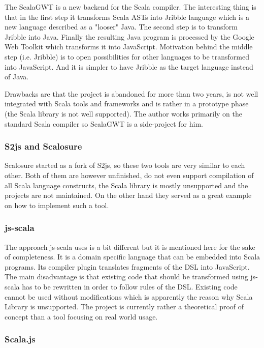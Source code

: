 \documentclass[12pt,a4paper]{report}
\begin{document}
The ScalaGWT is a new backend for the Scala compiler. The interesting thing is that in the first step it transforms Scala ASTs into Jribble language which is a new language described as a "looser" Java. The second step is to transform Jribble into Java. Finally the resulting Java program is processed by the Google Web Toolkit \cite{Gwt} which transforms it into JavaScript. Motivation behind the middle step (i.e. Jribble) is to open possibilities for other languages to be transformed into JavaScript. And it is simpler to have Jribble as the target language instead of Java.

Drawbacks are that the project is abandoned for more than two years, is not well integrated with Scala tools and frameworks and is rather in a prototype phase (the Scala library is not well supported). The author works primarily on the standard Scala compiler so ScalaGWT is a side-project for him.

\subsubsection*{S2js and Scalosure}

Scalosure started as a fork of S2js, so these two tools are very similar to each other. Both of them are however unfinished, do not even support compilation of all Scala language constructs, the Scala library is mostly unsupported and the projects are not maintained. On the other hand they served as a great example on how to implement such a tool.

\subsubsection*{js-scala}

The approach js-scala uses is a bit different but it is mentioned here for the sake of completeness. It is a domain specific language that can be embedded into Scala programs. Its compiler plugin translates fragments of the DSL into JavaScript. The main disadvantage is that existing code that should be transformed using js-scala has to be rewritten in order to follow rules of the DSL. Existing code cannot be used without modifications which is apparently the reason why Scala Library is unsupported. The project is currently rather a theoretical proof of concept than a tool focusing on real world usage.

\subsubsection*{Scala.js}
\end{document}
